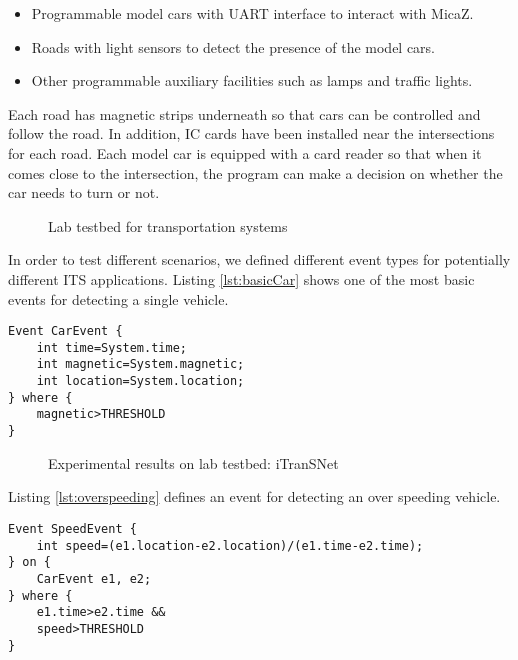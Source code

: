 \begin{itemize}
\item Programmable model cars with UART interface to interact with MicaZ.
\item Roads with light sensors to detect the presence of the model cars.
\item Other programmable auxiliary facilities such as lamps and traffic lights.
\end{itemize}

Each road has magnetic strips underneath so that cars can be controlled and follow the road. In addition, IC cards have been installed near the intersections for each road. Each model car is equipped with a card reader so that when it comes close to the intersection, the program can make a decision on whether the car needs to turn or not.

\begin{figure}
\centering
{}
\caption{Lab testbed for transportation systems}
\label{fig:itransnet}
\end{figure}

In order to test different scenarios, we defined different event types for potentially different ITS applications. Listing \ref{lst:basicCar} shows one of the most basic events for detecting a single vehicle. 
\begin{lstlisting}[caption=Event definition for detecting a single vehicle, label=lst:basicCar]
Event CarEvent {
	int time=System.time;
	int magnetic=System.magnetic;
	int location=System.location;
} where {
	magnetic>THRESHOLD
}
\end{lstlisting}

\begin{figure}
\centering
{}
\caption{Experimental results on lab testbed: iTranSNet}
\label{fig:itransnetResults}
\end{figure}

Listing \ref{lst:overspeeding} defines an event for detecting an over speeding vehicle.
\begin{lstlisting}[caption=Event definition for over speeding, label=lst:overspeeding]
Event SpeedEvent {
	int speed=(e1.location-e2.location)/(e1.time-e2.time);
} on {
	CarEvent e1, e2;
} where {
	e1.time>e2.time &&
	speed>THRESHOLD
}
\end{lstlisting}

